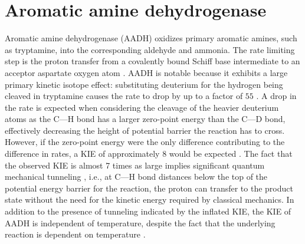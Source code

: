 
\section{Aromatic amine dehydrogenase}

Aromatic amine dehydrogenase (AADH) oxidizes primary aromatic amines, such as tryptamine, into the corresponding aldehyde and ammonia. The rate limiting step is the proton transfer from a covalently bound Schiff base intermediate to an acceptor aspartate oxygen atom \cite{masgrauAtomicDescriptionEnzyme2006}.  AADH is notable because it exhibits a large primary kinetic isotope effect: substituting deuterium for the hydrogen being cleaved in tryptamine causes the rate to drop by up to a factor of $55$ \cite{masgrauAtomicDescriptionEnzyme2006}.  A drop in the rate is expected when considering the cleavage of the heavier deuterium atoms as the C---H bond has a larger zero-point energy than the C---D bond, effectively decreasing the height of potential barrier the reaction has to cross. However, if the zero-point energy were the only difference contributing to the difference in rates, a KIE of approximately \num{8} would be expected \cite{antoniouLargeKineticIsotope1997}.  The fact that the observed KIE is almost \num{7} times as large implies significant quantum mechanical tunneling \cite{masgrauAtomicDescriptionEnzyme2006, klinmanbeyond2009, basranImportanceBarrierShape2001a}, i.e., at C---H bond distances below the top of the potential energy barrier for the reaction, the proton can transfer to the product state without the need for the kinetic energy required by classical mechanics.  In addition to the presence of tunneling indicated by the inflated KIE, the KIE of AADH is independent of temperature, despite the fact that the underlying reaction is dependent on temperature \cite{masgrauAtomicDescriptionEnzyme2006}. 


